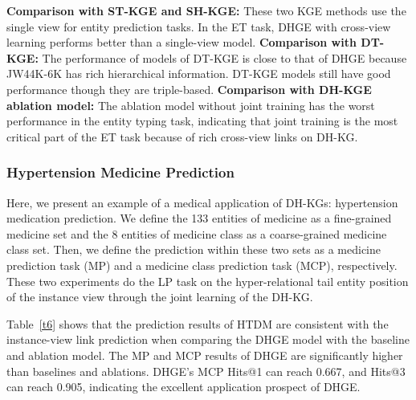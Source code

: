 \documentclass[letterpaper]{article} \usepackage{aaai23}  \usepackage{times}  \usepackage{helvet}  \usepackage{courier}  \usepackage[hyphens]{url}  \usepackage{graphicx} \urlstyle{rm} \def\UrlFont{\rm}  \usepackage{natbib}  \usepackage{caption} \frenchspacing  \setlength{\pdfpagewidth}{8.5in}  \setlength{\pdfpageheight}{11in}  \usepackage{times}
\begin{document}
\textbf{Comparison with ST-KGE and SH-KGE:} These two KGE methods use the single view for entity prediction tasks. In the ET task, DHGE with cross-view learning performs better than a single-view model.
\textbf{Comparison with DT-KGE:} The performance of models of DT-KGE is close to that of DHGE because JW44K-6K has rich hierarchical information. DT-KGE models still have good performance though they are triple-based.
\textbf{Comparison with DH-KGE ablation model:} The ablation model without joint training has the worst performance in the entity typing task, indicating that joint training is the most critical part of the ET task because of rich cross-view links on DH-KG.

\subsubsection{Hypertension Medicine Prediction}
Here, we present an example of a medical application of DH-KGs: hypertension medication prediction. We define the 133 entities of medicine as a fine-grained medicine set and the 8 entities of medicine class as a coarse-grained medicine class set. Then, we define the prediction within these two sets as a medicine prediction task (MP) and a medicine class prediction task (MCP), respectively. These two experiments do the LP task on the hyper-relational tail entity position of the instance view through the joint learning of the DH-KG. 

Table~\ref{t6} shows that the prediction results of HTDM are consistent with the instance-view link prediction when comparing the DHGE model with the baseline and ablation model. The MP and MCP results of DHGE are significantly higher than baselines and ablations. DHGE’s MCP Hits@1 can reach 0.667, and Hits@3 can reach 0.905, indicating the excellent application prospect of DHGE.  
\end{document}
